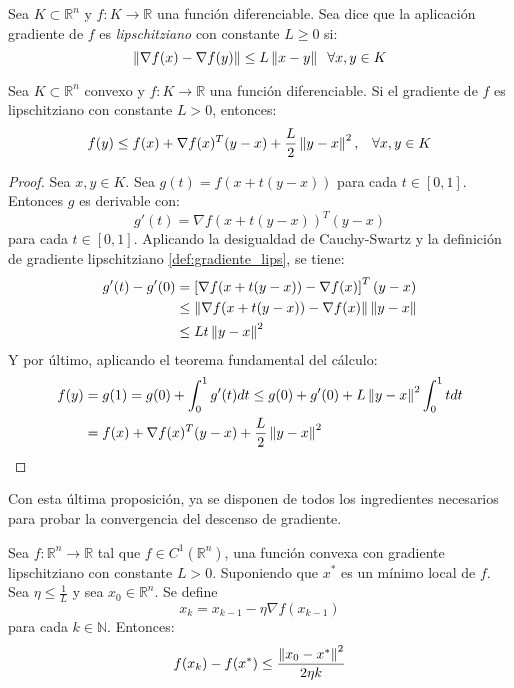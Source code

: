 \begin{definition}\label{def:gradiente_lips}
    Sea $K \subset \mathbb{R}^n$ y $f: K \rightarrow \mathbb{R}$ una función diferenciable. Sea dice que la aplicación gradiente de $f$ es \textit{lipschitziano} con constante $L\geq 0$ si:
    \[
        \left\lVert\nabla f(x) - \nabla f(y)\right\rVert \leq L \left\lVert x-y\right\rVert \;\; \forall x,y \in K
    \]
\end{definition}

\begin{proposition}
    Sea $K\subset \mathbb{R}^n$ convexo y $f: K \longrightarrow \mathbb{R}$ una función diferenciable. Si el gradiente de $f$ es lipschitziano con constante $L>0$, entonces:
    \begin{equation}\label{prop:ineq}
        f(y) \leq f(x) + \nabla f(x)^T(y-x) + \frac{L}{2}\left\lVert y-x\right\rVert^2, \;\;\; \forall x,y \in K
    \end{equation}
\end{proposition}

\begin{proof}
    Sea $x,y\in K$. Sea $g(t)=f(x+t(y-x))$ para cada $t\in[0,1]$. Entonces $g$ es derivable con:
    \[
        g'(t) = \nabla f(x+t(y-x))^T(y-x)
    \]
    para cada $t\in [0,1]$. Aplicando la desigualdad de Cauchy-Swartz y la definición de gradiente lipschitziano \ref{def:gradiente_lips}, se tiene:
    \begin{align*}
        g'(t) - g'(0) & = \left[ \nabla f(x+t(y-x))-\nabla f(x) \right]^T (y-x)\\
         & \leq \left\lVert\nabla f(x+t(y-x))-\nabla f(x)\right\rVert \left\lVert y-x\right\rVert \\
         & \leq Lt\left\lVert y-x\right\rVert^2
    \end{align*}
    Y por último, aplicando el teorema fundamental del cálculo:
    \begin{align*}
        f(y) & = g(1) = g(0)  + \displaystyle\int_0^1g'(t)dt \leq g(0) + g'(0) + L\left\lVert y-x\right\rVert^2\int_0^1tdt \\
             & = f(x) + \nabla f(x)^T(y-x) + \frac{L}{2}\left\lVert y-x\right\rVert^2
    \end{align*}
\end{proof}

Con esta última proposición, ya se disponen de todos los ingredientes necesarios para probar la convergencia del descenso de gradiente.

\begin{proposition}
    Sea $f: \mathbb{R}^n \longrightarrow \mathbb{R}$ tal que $f\in C^1(\mathbb{R}^n)$, una función convexa con gradiente lipschitziano con constante
    $L>0$. Suponiendo que $x^*$ es un mínimo local de $f$. Sea $\eta \leq \frac{1}{L}$ y sea $x_0\in\mathbb{R}^n$. Se define
    \[
        x_k = x_{k-1} - \eta \nabla f(x_{k-1})
    \]
    para cada $k\in\mathbb{N}$. Entonces:
    \[
        f(x_k)-f(x^*) \leq \frac{\left\lVert x_0-x^*\right\rVert^2}{2\eta k}
    \]
\end{proposition}

